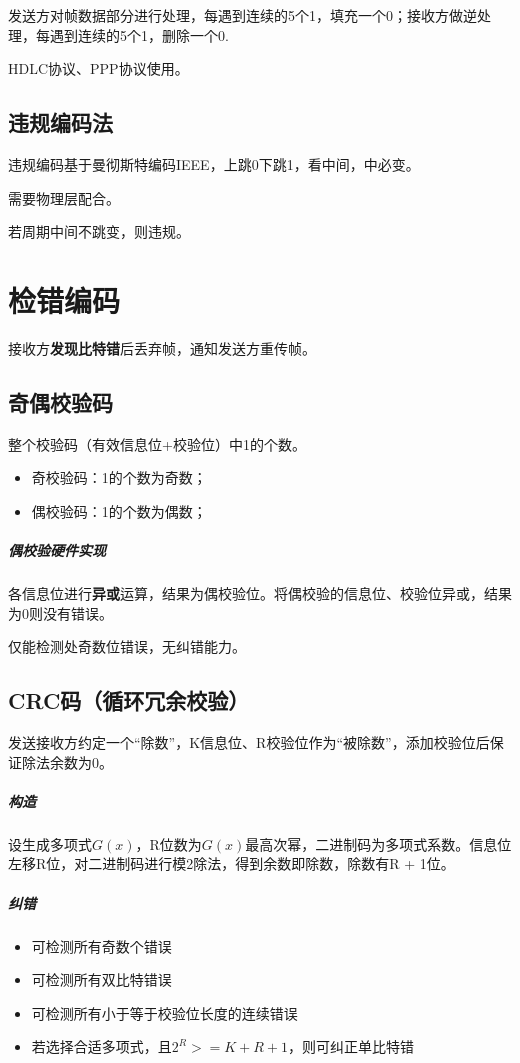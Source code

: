 发送方对帧数据部分进行处理，每遇到连续的5个1，填充一个0；接收方做逆处理，每遇到连续的5个1，删除一个0.

HDLC协议、PPP协议使用。


\subsection{违规编码法}
违规编码基于曼彻斯特编码IEEE，上跳0下跳1，看中间，中必变。

需要物理层配合。

若周期中间不跳变，则违规。


\section{检错编码}\label{检错编码}
接收方\textbf{发现比特错}后丢弃帧，通知发送方重传帧。

\subsection{奇偶校验码}
整个校验码（有效信息位+校验位）中1的个数。
\begin{itemize}
    \item 奇校验码：1的个数为奇数；
    \item 偶校验码：1的个数为偶数；
\end{itemize}
\subparagraph{偶校验硬件实现}
各信息位进行\textbf{异或}运算，结果为偶校验位。将偶校验的信息位、校验位异或，结果为0则没有错误。

仅能检测处奇数位错误，无纠错能力。


\subsection{CRC码（循环冗余校验）}
发送接收方约定一个“除数”，K信息位、R校验位作为“被除数”，添加校验位后保证除法余数为0。

\subparagraph{构造}
设生成多项式\(G(x)\)，R位数为\(G(x)\)最高次幂，二进制码为多项式系数。信息位左移R位，对二进制码进行模2除法，得到余数即除数，除数有R + 1位。

\subparagraph{纠错}
\begin{itemize}
    \item 可检测所有奇数个错误
    \item 可检测所有双比特错误
    \item 可检测所有小于等于校验位长度的连续错误
    \item 若选择合适多项式，且\(2^R >= K + R + 1\)，则可纠正单比特错
\end{itemize}


